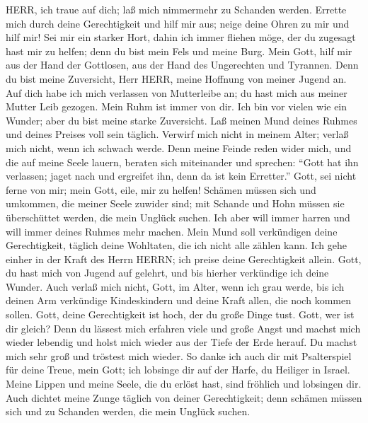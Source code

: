  HERR, ich traue auf dich; laß mich nimmermehr zu Schanden
werden.  Errette mich durch deine Gerechtigkeit und hilf mir
aus; neige deine Ohren zu mir und hilf mir!  Sei mir ein
starker Hort, dahin ich immer fliehen möge, der du zugesagt hast mir zu
helfen; denn du bist mein Fels und meine Burg.  Mein Gott,
hilf mir aus der Hand der Gottlosen, aus der Hand des Ungerechten und
Tyrannen.  Denn du bist meine Zuversicht, Herr HERR, meine
Hoffnung von meiner Jugend an.  Auf dich habe ich mich
verlassen von Mutterleibe an; du hast mich aus meiner Mutter Leib
gezogen. Mein Ruhm ist immer von dir.  Ich bin vor vielen
wie ein Wunder; aber du bist meine starke Zuversicht.  Laß
meinen Mund deines Ruhmes und deines Preises voll sein täglich.
 Verwirf mich nicht in meinem Alter; verlaß mich nicht, wenn
ich schwach werde.  Denn meine Feinde reden wider mich, und
die auf meine Seele lauern, beraten sich miteinander  und
sprechen: ``Gott hat ihn verlassen; jaget nach und ergreifet ihn, denn
da ist kein Erretter.''  Gott, sei nicht ferne von mir;
mein Gott, eile, mir zu helfen!  Schämen müssen sich und
umkommen, die meiner Seele zuwider sind; mit Schande und Hohn müssen sie
überschüttet werden, die mein Unglück suchen.  Ich aber
will immer harren und will immer deines Ruhmes mehr machen.
 Mein Mund soll verkündigen deine Gerechtigkeit, täglich
deine Wohltaten, die ich nicht alle zählen kann.  Ich gehe
einher in der Kraft des Herrn HERRN; ich preise deine Gerechtigkeit
allein.  Gott, du hast mich von Jugend auf gelehrt, und bis
hierher verkündige ich deine Wunder.  Auch verlaß mich
nicht, Gott, im Alter, wenn ich grau werde, bis ich deinen Arm
verkündige Kindeskindern und deine Kraft allen, die noch kommen sollen.
 Gott, deine Gerechtigkeit ist hoch, der du große Dinge
tust. Gott, wer ist dir gleich?  Denn du lässest mich
erfahren viele und große Angst und machst mich wieder lebendig und holst
mich wieder aus der Tiefe der Erde herauf.  Du machst mich
sehr groß und tröstest mich wieder.  So danke ich auch dir
mit Psalterspiel für deine Treue, mein Gott; ich lobsinge dir auf der
Harfe, du Heiliger in Israel.  Meine Lippen und meine
Seele, die du erlöst hast, sind fröhlich und lobsingen dir.
 Auch dichtet meine Zunge täglich von deiner Gerechtigkeit;
denn schämen müssen sich und zu Schanden werden, die mein Unglück
suchen.

